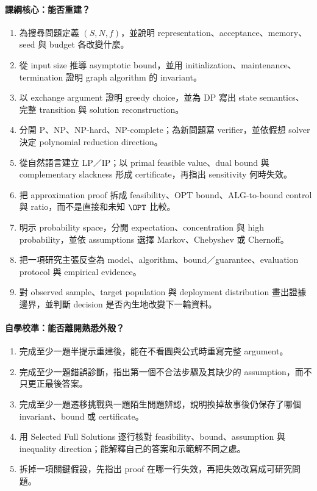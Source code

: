 \documentclass[11pt,a4paper,oneside,openany]{book}
\begin{document}
\paragraph{課綱核心：能否重建？}
\begin{enumerate}[label={\(\circ\)},leftmargin=2em]
\item 為搜尋問題定義 $(S,N,f)$，並說明 representation、acceptance、memory、seed 與 budget 各改變什麼。
\item 從 input size 推導 asymptotic bound，並用 initialization、maintenance、termination 證明 graph algorithm 的 invariant。
\item 以 exchange argument 證明 greedy choice，並為 DP 寫出 state semantics、完整 transition 與 solution reconstruction。
\item 分開 P、NP、NP-hard、NP-complete；為新問題寫 verifier，並依假想 solver 決定 polynomial reduction direction。
\item 從自然語言建立 LP／IP；以 primal feasible value、dual bound 與 complementary slackness 形成 certificate，再指出 sensitivity 何時失效。
\item 把 approximation proof 拆成 feasibility、OPT bound、ALG-to-bound control 與 ratio，而不是直接和未知 $\OPT$ 比較。
\item 明示 probability space，分開 expectation、concentration 與 high probability，並依 assumptions 選擇 Markov、Chebyshev 或 Chernoff。
\item 把一項研究主張反查為 model、algorithm、bound／guarantee、evaluation protocol 與 empirical evidence。
\item 對 observed sample、target population 與 deployment distribution 畫出證據邊界，並判斷 decision 是否內生地改變下一輪資料。
\end{enumerate}

\paragraph{自學校準：能否離開熟悉外殼？}
\begin{enumerate}[label={\(\circ\)},leftmargin=2em]
\item 完成至少一題半提示重建後，能在不看圖與公式時重寫完整 argument。
\item 完成至少一題錯誤診斷，指出第一個不合法步驟及其缺少的 assumption，而不只更正最後答案。
\item 完成至少一題遷移挑戰與一題陌生問題辨認，說明換掉故事後仍保存了哪個 invariant、bound 或 certificate。
\item 用 Selected Full Solutions 逐行核對 feasibility、bound、assumption 與 inequality direction；能解釋自己的答案和示範解不同之處。
\item 拆掉一項關鍵假設，先指出 proof 在哪一行失效，再把失效改寫成可研究問題。
\end{enumerate}
\end{document}
